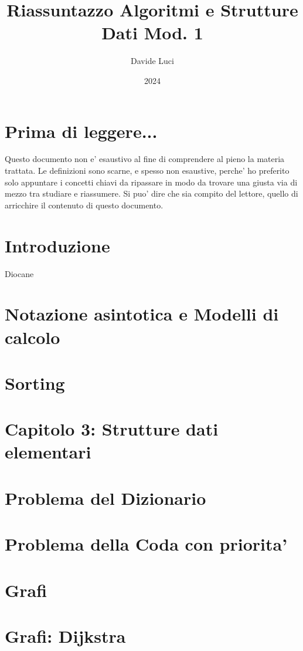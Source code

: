 \documentclass{article}
\title{Riassuntazzo Algoritmi e Strutture Dati Mod. 1}
\author{Davide Luci}
\date{2024}
\begin{document}
    \maketitle
    \tableofcontents
    \newpage


    \setlength{\parindent}{0pt}
    \section{ Prima di leggere...}
    Questo documento non e' esaustivo al fine di comprendere al pieno la materia trattata.
    Le definizioni sono scarne, e spesso non esaustive, perche' ho preferito solo appuntare i concetti chiavi
    da ripassare in modo da trovare una giusta via di mezzo tra studiare e riassumere. Si puo' dire che sia compito del 
    lettore, quello di arricchire il contenuto di questo documento.

    \newpage

    \section*{ Introduzione}
    Diocane

    \newpage
    \section{ Notazione asintotica e Modelli di calcolo}

    \newpage
    \section{ Sorting }

    \newpage
    \section{ Capitolo 3: Strutture dati elementari }
        
        \newpage
    \section {Problema del Dizionario}
        
        \newpage
    \section {Problema della Coda con priorita'}
        
        \newpage

    \section {Grafi}
        

    \section {Grafi: Dijkstra}
        
\end{document}
